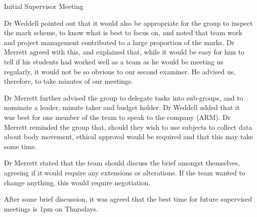 \documentclass{article}
\begin{document}
\begin{Minutes}{Initial Supervisor Meeting}

Dr Weddell pointed out that it would also be appropriate for the group to
inspect the mark scheme, to know what is best to focus on, and
noted that team work and project management contributed to a large
proportion of the marks. Dr Merrett agreed with this, and explained
that, while it would be easy for him to tell if his students had worked well as a team
as he would be meeting us regularly, it would not be so obvious to our
second examiner. He advised us, therefore, to take minutes of our meetings.

Dr Merrett further advised the group to delegate tasks into
sub-groups, and to nominate a leader, minute taker and budget holder. Dr
Weddell added that it was best for one member of the team to speak to
the company (ARM). Dr Merrett reminded the group that, should they wish to use
subjects to collect data about body movement, ethical approval would be
required and that this may take some time.


Dr Merrett stated that the team should discuss the brief amongst
themselves, agreeing if it would require any extensions or alterations. If the team
wanted to change anything, this would require negotiation.

After some brief discussion, it was agreed that the best
time for future supervised meetings is 1pm on Thursdays.


\end{Minutes}
\end{document}
